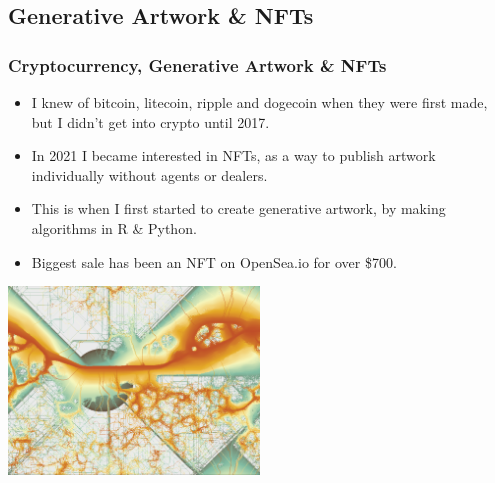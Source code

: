 \documentclass{beamer}
\begin{document}
				\subsection{Generative Artwork \& NFTs}
\begin{frame}
	\frametitle{Cryptocurrency, Generative Artwork \& NFTs}
	\begin{itemize}
		\item I knew of bitcoin, litecoin, ripple and dogecoin when they were first made, but I didn't get into crypto until 2017.
		\item In 2021 I became interested in NFTs, as a way to publish artwork individually without agents or dealers.
		\item This is when I first started to create generative artwork, by making algorithms in R \& Python.
		\item Biggest sale has been an NFT on OpenSea.io for over \$700.  
	\end{itemize}
	\begin{center}
		\includegraphics[width = 0.5\textwidth]{images/first cover.png}
	\end{center}
\end{frame}
\end{document}
